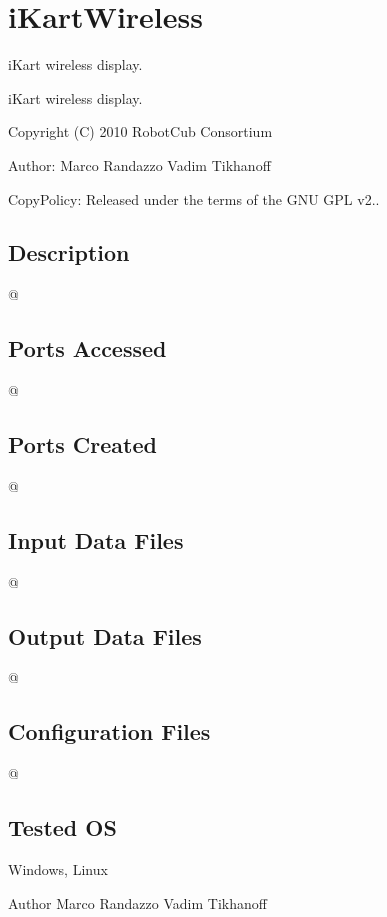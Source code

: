 \section{i\+Kart\+Wireless}
\label{group__iKartWireless}


i\+Kart wireless display.  


i\+Kart wireless display. 

Copyright (C) 2010 Robot\+Cub Consortium

Author\+: Marco Randazzo Vadim Tikhanoff

Copy\+Policy\+: Released under the terms of the G\+N\+U G\+P\+L v2..\hypertarget{group__laserScannerGui_intro_sec}{}\subsection{Description}\label{group__laserScannerGui_intro_sec}
@\hypertarget{group__laserScannerGui_portsa_sec}{}\subsection{Ports Accessed}\label{group__laserScannerGui_portsa_sec}
@\hypertarget{group__laserScannerGui_portsc_sec}{}\subsection{Ports Created}\label{group__laserScannerGui_portsc_sec}
@\hypertarget{group__laserScannerGui_in_files_sec}{}\subsection{Input Data Files}\label{group__laserScannerGui_in_files_sec}
@\hypertarget{group__laserScannerGui_out_data_sec}{}\subsection{Output Data Files}\label{group__laserScannerGui_out_data_sec}
@\hypertarget{group__laserScannerGui_conf_file_sec}{}\subsection{Configuration Files}\label{group__laserScannerGui_conf_file_sec}
@\hypertarget{group__laserScannerGui_tested_os_sec}{}\subsection{Tested O\+S}\label{group__laserScannerGui_tested_os_sec}
Windows, Linux

\begin{DoxyAuthor}{Author}
Marco Randazzo Vadim Tikhanoff 
\end{DoxyAuthor}
